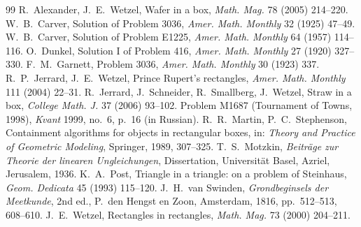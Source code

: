 \documentclass[11pt]{article}
\theoremstyle{definition}
\theoremstyle{remark}
\begin{document}
\begin{thebibliography}{99}
 R.~Alexander, J.~E.~Wetzel, Wafer in a box, \emph{Math. Mag.} 78 (2005) 214--220.
 W.~B.~Carver, Solution of Problem 3036, \emph{Amer. Math. Monthly} 32 (1925) 47--49.
 W.~B.~Carver, Solution of Problem E1225, \emph{Amer. Math. Monthly} 64 (1957) 114--116.
 O.~Dunkel, Solution I of Problem 416, \emph{Amer. Math. Monthly} 27 (1920) 327--330.
 F.~M.~Garnett, Problem 3036, \emph{Amer. Math. Monthly} 30 (1923) 337.
 R.~P.~Jerrard, J.~E.~Wetzel, Prince Rupert's rectangles, \emph{Amer. Math. Monthly} 111 (2004) 22--31.
 R.~Jerrard, J.~Schneider, R.~Smallberg, J.~Wetzel, Straw in a box, \emph{College Math. J.} 37 (2006) 93--102.
 Problem M1687 (Tournament of Towns, 1998), \emph{Kvant} 1999, no.~6, p.~16 (in Russian).
 R.~R.~Martin, P.~C.~Stephenson, Containment algorithms for objects in rectangular boxes, in: \emph{Theory and Practice of Geometric Modeling}, Springer, 1989, 307--325.
 T.~S.~Motzkin, \emph{Beitr\"age zur Theorie der linearen Ungleichungen}, Dissertation, Universit\"at Basel, Azriel, Jerusalem, 1936.
 K.~A.~Post, Triangle in a triangle: on a problem of Steinhaus, \emph{Geom. Dedicata} 45 (1993) 115--120.
 J.~H.~van Swinden, \emph{Grondbeginsels der Meetkunde}, 2nd ed., P.~den Hengst en Zoon, Amsterdam, 1816, pp.~512--513, 608--610.
 J.~E.~Wetzel, Rectangles in rectangles, \emph{Math. Mag.} 73 (2000) 204--211.
\end{thebibliography}
\end{document}
